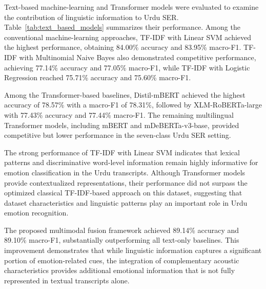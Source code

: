 Text-based machine-learning and Transformer models were evaluated to examine the contribution of linguistic information to Urdu SER. Table~\ref{tab:text_based_models} summarizes their performance. Among the conventional machine-learning approaches, TF-IDF with Linear SVM achieved the highest performance, obtaining 84.00\% accuracy and 83.95\% macro-F1. TF-IDF with Multinomial Naive Bayes also demonstrated competitive performance, achieving 77.14\% accuracy and 77.05\% macro-F1, while TF-IDF with Logistic Regression reached 75.71\% accuracy and 75.60\% macro-F1.

Among the Transformer-based baselines, Distil-mBERT achieved the highest accuracy of 78.57\% with a macro-F1 of 78.31\%, followed by XLM-RoBERTa-large with 77.43\% accuracy and 77.44\% macro-F1. The remaining multilingual Transformer models, including mBERT and mDeBERTa-v3-base, provided competitive but lower performance in the seven-class Urdu SER setting.

The strong performance of TF-IDF with Linear SVM indicates that lexical patterns and discriminative word-level information remain highly informative for emotion classification in the Urdu transcripts. Although Transformer models provide contextualized representations, their performance did not surpass the optimized classical TF-IDF-based approach on this dataset, suggesting that dataset characteristics and linguistic patterns play an important role in Urdu emotion recognition.

The proposed multimodal fusion framework achieved 89.14\% accuracy and 89.10\% macro-F1, substantially outperforming all text-only baselines. This improvement demonstrates that while linguistic information captures a significant portion of emotion-related cues, the integration of complementary acoustic characteristics provides additional emotional information that is not fully represented in textual transcripts alone.
